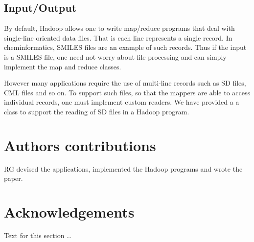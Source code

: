 \documentclass[10pt]{bmc_article}
\newenvironment{bmcformat}{\begin{raggedright}\baselineskip20pt\sloppy\setboolean{publ}{false}}{\end{raggedright}\baselineskip20pt\sloppy}
\begin{document}
\begin{bmcformat}
\subsection*{Input/Output}
\label{sec:inputoutput}

By default, Hadoop allows one to write map/reduce programs that deal
with single-line oriented data files. That is each line represents a
single record. In cheminformatics, SMILES files are an example of such
records. Thus if the input is a SMILES file, one need not worry about
file processing and can simply implement the map and reduce classes.

However many applications require the use of multi-line records such
as SD files, CML files and so on. To support such files, so that the
mappers are able to access individual records, one must implement
custom readers. We have provided a a class to support the reading of
SD files in a Hadoop program.
    
\section*{Authors contributions}
RG devised the applications, implemented the Hadoop programs and wrote the paper.

    

\section*{Acknowledgements}
  Text for this section \ldots


 



\end{bmcformat}
\end{document}
